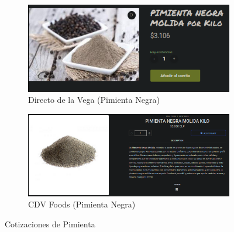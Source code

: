 \documentclass[12pt]{article}
\begin{document}
    \begin{figure}[H]
        \centering
        \begin{subfigure}{0.48\textwidth}
            \centering
            \includegraphics[width=\linewidth]{negra} %
            \caption{Directo de la Vega (Pimienta Negra)}
            \label{fig:directo_de_la_vega_pimienta}
        \end{subfigure}
        \hfill
        \begin{subfigure}{0.48\textwidth}
            \centering
            \includegraphics[width=\linewidth]{pimienta} %
            \caption{CDV Foods (Pimienta Negra)}
            \label{fig:cdv_foods_pimienta}
        \end{subfigure}
        \caption{Cotizaciones de Pimienta}
        \label{fig:cotizaciones_pimienta}
    \end{figure}
\end{document}
